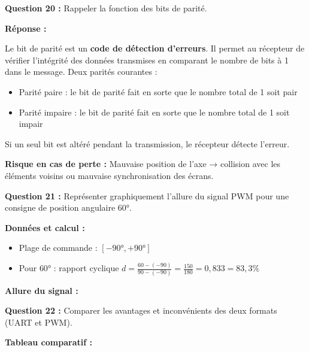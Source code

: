 \documentclass[12pt,a4paper,twoside]{article}
\begin{document}
\begin{correction}
  \textbf{Question 20 :} Rappeler la fonction des bits de parité.

  \textbf{Réponse :}

  Le bit de parité est un \textbf{code de détection d'erreurs}. Il permet au récepteur de vérifier l'intégrité des données transmises en comparant le nombre de bits à 1 dans le message. Deux parités courantes :
  \begin{itemize}
    \item Parité paire : le bit de parité fait en sorte que le nombre total de 1 soit pair
    \item Parité impaire : le bit de parité fait en sorte que le nombre total de 1 soit impair
  \end{itemize}

  Si un seul bit est altéré pendant la transmission, le récepteur détecte l'erreur.

  \textbf{Risque en cas de perte :} Mauvaise position de l'axe → collision avec les éléments voisins ou mauvaise synchronisation des écrans.

  \textbf{Question 21 :} Représenter graphiquement l'allure du signal PWM pour une consigne de position angulaire $60°$.

  \textbf{Données et calcul :}
  \begin{itemize}
    \item Plage de commande : $[-90°, +90°]$
    \item Pour $60°$ : rapport cyclique $d = \frac{60 - (-90)}{90 - (-90)} = \frac{150}{180} = 0,833 = 83,3\%$
  \end{itemize}

  \textbf{Allure du signal :}


  \textbf{Question 22 :} Comparer les avantages et inconvénients des deux formats (UART et PWM).

  \textbf{Tableau comparatif :}


\end{correction}
\end{document}
